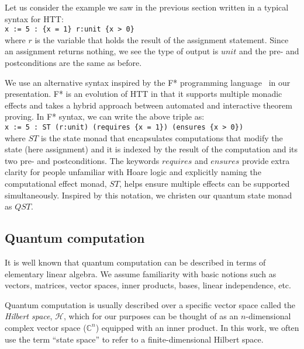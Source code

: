 Let us consider the example we saw in the previous section written in a typical syntax for HTT:\medskip\\
\indent\indent\lstinline[language=QHaskell]!x := 5 : {x = 1} r:unit {x > 0}!
\medskip\\where $r$ is the variable that holds the result of the assignment statement. Since an assignment returns nothing, we see the type of output is $unit$ and the pre- and postconditions are the same as before.

We use an alternative syntax inspired by the F* programming language~\parencite{fstar} in our presentation. F* is an evolution of HTT in that it supports multiple monadic effects and takes a hybrid approach between automated and interactive theorem proving. In F* syntax, we can write the above triple as:\medskip\\
\indent\indent\lstinline[language=QHaskell]!x := 5 : ST (r:unit) (requires {x = 1}) (ensures {x > 0})!
\medskip\\where $ST$ is the state monad that encapsulates computations that modify the state (here assignment) and it is indexed by the result of the computation and its two pre- and postconditions. The keywords $requires$ and $ensures$ provide extra clarity for people unfamiliar with Hoare logic and explicitly naming the computational effect monad, $ST$, helps ensure multiple effects can be supported simultaneously. Inspired by this notation, we christen our quantum state monad as $QST$.

\subsection{Quantum computation}
It is well known that quantum computation can be described in terms of elementary linear algebra. We assume familiarity with basic notions such as vectors, matrices, vector spaces, inner products, bases, linear independence, etc.

Quantum computation is usually described over a specific vector space called the \textit{Hilbert space}, $\mathcal{H}$, which for our purposes can be thought of as an $n$-dimensional complex vector space ($\mathbb{C}^n$) equipped with an inner product. In this work, we often use the term ``state space'' to refer to a finite-dimensional Hilbert space.

